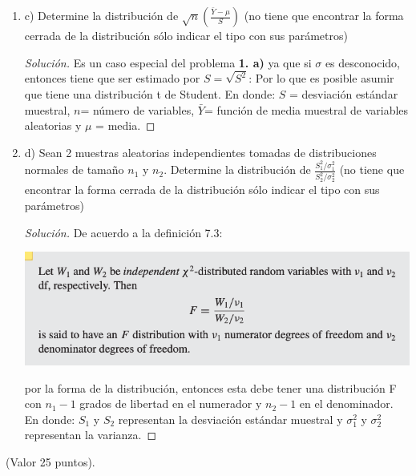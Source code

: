\documentclass[a4paper,12pt]{article}
\newenvironment{solution}
  {\renewcommand\qedsymbol{$\blacksquare$}\begin{proof}[Solución]}
  {\end{proof}}
\begin{document}
\begin{enumerate}
\begin{solution}
\end{solution}
\item c) Determine la distribución de $\sqrt{n}\left(\frac{\bar{Y}-\mu}{S}\right)$ (no tiene que encontrar la forma cerrada de la distribución sólo indicar el tipo con sus parámetros)
\begin{solution}
Es un caso especial del problema \textbf{1. a)} ya que si $\sigma$ es desconocido, entonces tiene que ser estimado por $S=\sqrt{S^2}$:  Por lo que es posible asumir que tiene una distribución t de Student. En donde: $S$ = desviación estándar muestral, $n$= número de variables, $\bar{Y}$= función de media muestral de variables aleatorias y $\mu$ = media.
\end{solution}
\item d) Sean 2 muestras aleatorias independientes tomadas de distribuciones normales de tamaño $n_{1}$ y $n_{2} .$ Determine la distribución de $\frac{S_{1}^{2} / \sigma_{1}^{2}}{S_{2}^{2} / \sigma_{2}^{2}}$ (no tiene que encontrar la forma cerrada de la distribución sólo indicar el tipo con sus parámetros)
\begin{solution}
De acuerdo a la definición 7.3: 
\begin{center}
    \includegraphics[scale=0.5]{images/4-d.png}
\end{center}
por la forma de la distribución, entonces esta debe tener una distribución F con $n_1-1$ grados de libertad en el numerador y $n_2-1$ en el denominador. En donde: $S_1$ y $S_2$ representan la desviación estándar muestral y $\sigma_1^2$ y $ \sigma_2^2$ representan la varianza.
\end{solution}
\end{enumerate}
(Valor 25 puntos).



\end{document}
